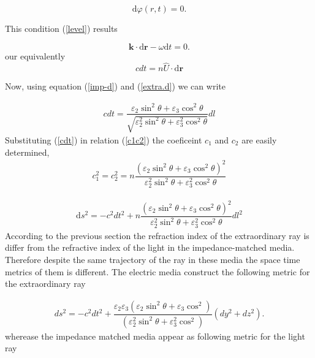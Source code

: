 \documentclass[9pt,twocolumn,twoside]{osajnl}
\begin{document}
\begin{equation}\label{level}
\mathrm{d}{\varphi(r,t)}=0.
\end{equation}

This condition (\ref{level}) results

\begin{equation}\label{phase1}
\mathbf{k}\cdot {\mathrm{d}\mathbf{r}}-\omega\mathrm{d}{t}=0.
\end{equation}
our equivalently 
\begin{equation}
c dt=n\hat{U}\cdot {\mathrm{d}\mathbf{r}}
\end{equation}

Now, using equation (\ref{imp-d}) and (\ref{extra.d}) we can write


\begin{eqnarray}\label{cdt}
c dt=\dfrac{\varepsilon_{2} \sin^{2}{\theta} + \varepsilon_{3}\cos^{2}{\theta}}{\sqrt{\varepsilon_{2}^{2} \sin^{2}{\theta} + \varepsilon_{3}^{2}\cos^{2}{\theta}}}dl
\end{eqnarray}
Substituting (\ref{cdt}) in relation (\ref{c1c2}) the coeficeint $c_{1}$ and $c_{2}$ are easily determined,
\begin{eqnarray}
c_{1}^{2}=c_{2}^{2}=n\dfrac{\left(\varepsilon_{2} \sin^{2}{\theta} + \varepsilon_{3}\cos^{2}{\theta}\right)^{2}}{\varepsilon_{2}^{2} \sin^{2}{\theta} + \varepsilon_{3}^{2}\cos^{2}{\theta}}
\end{eqnarray}

\begin{eqnarray}
\mathrm{d}s^{2}=-c^{2}dt^{2}+ n\dfrac{\left(\varepsilon_{2} \sin^{2}{\theta} + \varepsilon_{3}\cos^{2}{\theta}\right)^{2}}{\varepsilon_{2}^{2} \sin^{2}{\theta} + \varepsilon_{3}^{2}\cos^{2}{\theta}}dl^{2}
\end{eqnarray}
According to the previous section the refraction index of the extraordinary ray is differ from the refractive index of the light in the impedance-matched media. Therefore despite the  same trajectory of the ray in these media the space time metrics of them is different. The electric media construct the following metric for the extraordinary ray

\begin{eqnarray}
ds^{2}=- c^{2}dt^{2} + \dfrac{\varepsilon_{2}\varepsilon_{3}\left({\varepsilon_{2} \sin^{2}{\theta} + \varepsilon_{3}\cos^{2}}\right)}{\left({\varepsilon_{2}^{2} \sin^{2}{\theta} + \varepsilon_{3}^{2}\cos^{2}}\right)} {(dy^{2}+dz^{2})}.
\end{eqnarray}
wherease the impedance matched media appear as following metric for the light ray
\end{document}
